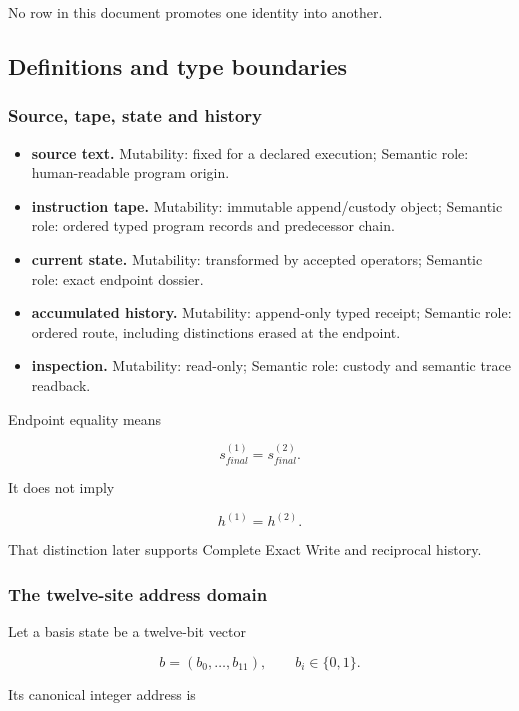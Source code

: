 No row in this document promotes one identity into another.

\subsection{Definitions and type
boundaries}\label{viii-ch02-definitions-and-type-boundaries}

\subsubsection{Source, tape, state and
history}\label{viii-ch02-source-tape-state-and-history}

\begin{itemize}
\tightlist
\item
  \textbf{source text.} Mutability: fixed for a declared execution;
  Semantic role: human-readable program origin.
\item
  \textbf{instruction tape.} Mutability: immutable append/custody
  object; Semantic role: ordered typed program records and predecessor
  chain.
\item
  \textbf{current state.} Mutability: transformed by accepted operators;
  Semantic role: exact endpoint dossier.
\item
  \textbf{accumulated history.} Mutability: append-only typed receipt;
  Semantic role: ordered route, including distinctions erased at the
  endpoint.
\item
  \textbf{inspection.} Mutability: read-only; Semantic role: custody and
  semantic trace readback.
\end{itemize}

Endpoint equality means

\[
s_{final}^{(1)}=s_{final}^{(2)}.
\]

It does not imply

\[
h^{(1)}=h^{(2)}.
\]

That distinction later supports Complete Exact Write and reciprocal
history.

\subsubsection{The twelve-site address
domain}\label{viii-ch02-the-twelve-site-address-domain}

Let a basis state be a twelve-bit vector

\[
b=(b_0,\ldots,b_{11}),\qquad b_i\in\{0,1\}.
\]

Its canonical integer address is

